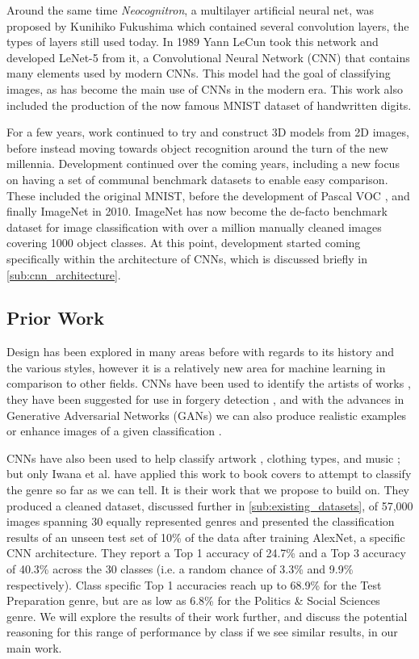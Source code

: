 \documentclass[12pt]{article}
\numberwithin{equation}{section}
\numberwithin{figure}{section}
\begin{document}
Around the same time \emph{Neocognitron}, a multilayer artificial neural net, was proposed by Kunihiko Fukushima which contained several convolution layers, the types of layers still used today. In 1989 Yann LeCun took this network and developed LeNet-5 from it, a Convolutional Neural Network (CNN) that contains many elements used by modern CNNs. This model had the goal of classifying images, as has become the main use of CNNs in the modern era. This work \cite{Cun1989} also included the production of the now famous MNIST dataset of handwritten digits. 

For a few years, work continued to try and construct 3D models from 2D images, before instead moving towards object recognition around the turn of the new millennia. Development continued over the coming years, including a new focus on having a set of communal benchmark datasets to enable easy comparison. These included the original MNIST, before the development of Pascal VOC \cite{Everingham10}, and finally ImageNet \cite{imagenet_cvpr09}in 2010. ImageNet has now become the de-facto benchmark dataset for image classification with over a million manually cleaned images covering 1000 object classes. At this point, development started coming specifically within the architecture of CNNs, which is discussed briefly in \cref{sub:cnn_architecture}.

\subsection{Prior Work} %
\label{sub:prior_work}
Design has been explored in many areas before with regards to its history and the various styles, however it is a relatively new area for machine learning in comparison to other fields. CNNs have been used to identify the artists of works \cite{Karayev2013}, they have been suggested for use in forgery detection \cite{Gideon2018}, and with the advances in Generative Adversarial Networks (GANs) we can also produce realistic examples or enhance images of a given classification \cite{Ledig2016}. 

CNNs have also been used to help classify artwork \cite{Zujovic2009}, clothing types\cite{Xiao2017}, and music \cite{Tzanetakis2002}; but only Iwana et al. \cite{KenjiIwana} have applied this work to book covers to attempt to classify the genre so far as we can tell. It is their work that we propose to build on. They produced a cleaned dataset, discussed further in \cref{sub:existing_datasets}, of 57,000 images spanning 30 equally represented genres and presented the classification results of an unseen test set of 10\% of the data after training AlexNet, a specific CNN architecture. They report a Top 1 accuracy of 24.7\% and a Top 3 accuracy of 40.3\%  across the 30 classes (i.e. a random chance of 3.3\% and 9.9\% respectively). Class specific Top 1 accuracies reach up to 68.9\% for the Test Preparation genre, but are as low as 6.8\% for the Politics \& Social Sciences genre. We will explore the results of their work further, and discuss the potential reasoning for this range of performance by class if we see similar results, in our main work.
\end{document}
